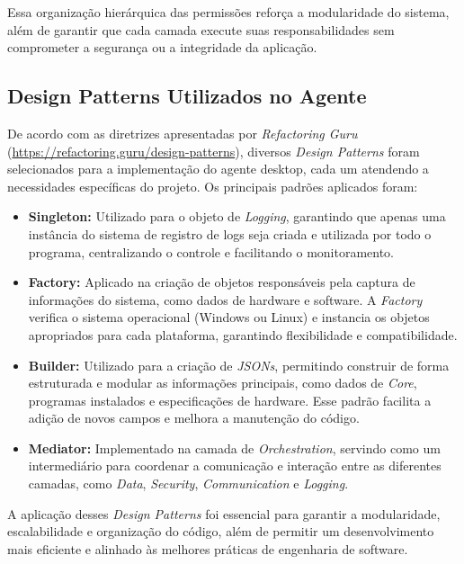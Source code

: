 Essa organização hierárquica das permissões reforça a modularidade do sistema, além de garantir que cada camada execute suas responsabilidades sem comprometer a segurança ou a integridade da aplicação.

\subsection{Design Patterns Utilizados no Agente}

De acordo com as diretrizes apresentadas por \textit{Refactoring Guru} (\url{https://refactoring.guru/design-patterns}), diversos \textit{Design Patterns} foram selecionados para a implementação do agente desktop, cada um atendendo a necessidades específicas do projeto. Os principais padrões aplicados foram:

\begin{itemize}
    \item \textbf{Singleton:} Utilizado para o objeto de \textit{Logging}, garantindo que apenas uma instância do sistema de registro de logs seja criada e utilizada por todo o programa, centralizando o controle e facilitando o monitoramento.

    \item \textbf{Factory:} Aplicado na criação de objetos responsáveis pela captura de informações do sistema, como dados de hardware e software. A \textit{Factory} verifica o sistema operacional (Windows ou Linux) e instancia os objetos apropriados para cada plataforma, garantindo flexibilidade e compatibilidade.

    \item \textbf{Builder:} Utilizado para a criação de \textit{JSONs}, permitindo construir de forma estruturada e modular as informações principais, como dados de \textit{Core}, programas instalados e especificações de hardware. Esse padrão facilita a adição de novos campos e melhora a manutenção do código.

    \item \textbf{Mediator:} Implementado na camada de \textit{Orchestration}, servindo como um intermediário para coordenar a comunicação e interação entre as diferentes camadas, como \textit{Data}, \textit{Security}, \textit{Communication} e \textit{Logging}.
\end{itemize}

A aplicação desses \textit{Design Patterns} foi essencial para garantir a modularidade, escalabilidade e organização do código, além de permitir um desenvolvimento mais eficiente e alinhado às melhores práticas de engenharia de software.


